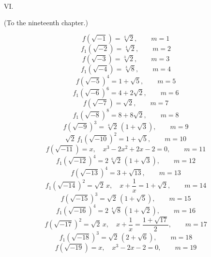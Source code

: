 
\begin{center}
 VI.


(To the nineteenth chapter.)
\end{center}

\[ f(\sqrt{-1}) = \sqrt[4]{2}, \qquad m = 1 \]
\[ f_1(\sqrt{-2}) = \sqrt[4]{2}, \qquad m = 2 \]
\[ f(\sqrt{-3}) = \sqrt[3]{2}, \qquad m = 3 \]
\[ f_1(\sqrt{-4}) = \sqrt[3]{8}, \qquad m = 4 \]
\[ f(\sqrt{-5})^4 = 1 + \sqrt5, \qquad m = 5 \]
\[ f_1(\sqrt{-6})^6 = 4 + 2\sqrt2, \qquad m = 6 \]
\[ f(\sqrt{-7}) = \sqrt2, \qquad m = 7 \]
\[ f_1(\sqrt{-8})^8 = 8 + 8\sqrt2, \qquad m = 8 \]
\[ f(\sqrt{-9})^3 = \sqrt[4]{2}\,(1+\sqrt3), \qquad m = 9 \]
\[ \sqrt2\,f_1(\sqrt{-10})^2 = 1 + \sqrt5, \qquad m = 10 \]
\[ f(\sqrt{-11}) = x, \quad x^3 - 2x^2 + 2x - 2 = 0, \qquad m = 11 \]
\[ f_1(\sqrt{-12})^4 = 2\,\sqrt[6]{2}\,(1+\sqrt3), \qquad m = 12 \]
\[ f(\sqrt{-13})^4 = 3 + \sqrt{13}, \qquad m = 13 \]
\[ f_1(\sqrt{-14})^2 = \sqrt2\,x, \quad x + \frac{1}{x} = 1 + \sqrt2, \qquad m = 14 \]
\[ f(\sqrt{-15})^3 = \sqrt2\,(1+\sqrt5), \qquad m = 15 \]
\[ f_1(\sqrt{-16})^4 = 2\,\sqrt[4]{8}\,(1+\sqrt2), \qquad m = 16 \]
\[ f(\sqrt{-17})^2 = \sqrt2\,x, \quad x + \frac{1}{x} = \frac{1+\sqrt{17}}{2}, \qquad m = 17 \]
\[ f_1(\sqrt{-18})^3 = \sqrt2\,(2+\sqrt6), \qquad m = 18 \]
\[ f(\sqrt{-19}) = x, \quad x^3 - 2x - 2 = 0, \qquad m = 19 \]
